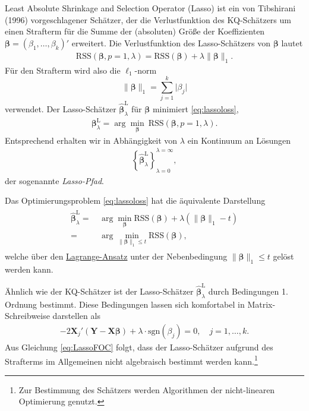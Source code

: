 \documentclass[
  a4paper,
  DIV=11,
  oneside]{scrreprt}
\begin{document}
Least Absolute Shrinkage and Selection Operator (Lasso) ist ein von
Tibshirani (1996) vorgeschlagener Schätzer, der die Verlustfunktion des
KQ-Schätzers um einen Strafterm für die Summe der (absoluten) Größe der
Koeffizienten \(\boldsymbol\beta = (\beta_1, \dots,\beta_k)'\)
erweitert. Die Verlustfunktion des Lasso-Schätzers von
\(\boldsymbol{\beta}\) lautet \begin{align}
\mathrm{RSS}(\boldsymbol{\beta},p=1,\lambda) = \mathrm{RSS}(\boldsymbol{\beta}) + \lambda \lVert\boldsymbol{\beta}\rVert_1.\label{eq:lassoloss}
\end{align} Für den Strafterm wird also die \(\ell_1\)-norm \[
\lVert\boldsymbol{\beta}\rVert_1 = \sum_{j=1}^k \lvert\beta_j \rvert
\] verwendet. Der Lasso-Schätzer
\(\widehat{\boldsymbol{\beta}}^{\mathrm{L}}_\lambda\) für
\(\boldsymbol{\beta}\) minimiert \eqref{eq:lassoloss}, \begin{align}
\boldsymbol{\beta}^{\mathrm{L}}_\lambda = \arg\min_{\boldsymbol{\beta}} \ \mathrm{RSS}(\boldsymbol{\beta},p=1,\lambda).
\end{align} Entsprechend erhalten wir in Abhängigkeit von \(\lambda\)
ein Kontinuum an Lösungen \begin{align}
  \left\{\widehat{\boldsymbol{\beta}}^{\mathrm{L}}_\lambda\right\}_{\lambda=0}^{\lambda=\infty},\label{eq:LassoPath}
\end{align} der sogenannte \emph{Lasso-Pfad}.

Das Optimierungsproblem \eqref{eq:lassoloss} hat die äquivalente
Darstellung \begin{align}
  \begin{split}
    \widehat{\boldsymbol{\beta}}^{\mathrm{L}}_\lambda =&\, \arg\min_{\boldsymbol{\beta}} \mathrm{RSS}(\boldsymbol{\beta}) + \lambda\left(\lVert\boldsymbol{\beta}\rVert_1 - t\right)\\
    =&\, \arg\min_{\lVert\boldsymbol{\beta}\rVert_1\leq t} \mathrm{RSS}(\boldsymbol{\beta}), 
  \end{split}\label{eq:lassolagrange}
\end{align} welche über den
\href{https://de.wikipedia.org/wiki/Lagrange-Multiplikator\#Beispiel_mit_Anwendungsbezug}{Lagrange-Ansatz}
unter der Nebenbedingung \(\lVert\boldsymbol{\beta}\rVert_1 \leq t\)
gelöst werden kann.

Ähnlich wie der KQ-Schätzer ist der Lasso-Schätzer
\(\widehat{\boldsymbol{\beta}}^{\mathrm{L}}_\lambda\) durch Bedingungen
1. Ordnung bestimmt. Diese Bedingungen lassen sich komfortabel in
Matrix-Schreibweise darstellen als \begin{align}
  -2\boldsymbol{X}_j'(\boldsymbol{Y} - \boldsymbol{X}\boldsymbol{\beta}) + \lambda\cdot\mathrm{sgn}(\beta_j) = 0, \quad j = 1,\dots,k.\label{eq:LassoFOC}
\end{align} Aus Gleichung \eqref{eq:LassoFOC} folgt, dass der
Lasso-Schätzer aufgrund des Strafterms im Allgemeinen nicht algebraisch
bestimmt werden kann.\footnote{Zur Bestimmung des Schätzers werden
  Algorithmen der nicht-linearen Optimierung genutzt.}
\end{document}
